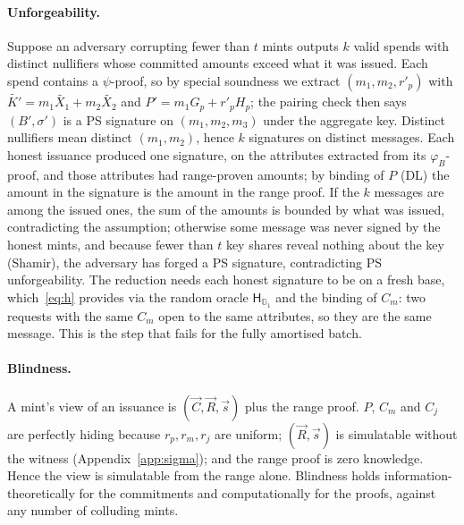 \documentclass[10pt,a5paper]{article}
\newcommand{\K}[1]{#1}                      %
\newcommand{\Go}[1]{#1}                     %
\newcommand{\Gt}[1]{\tilde{#1}}             %
\newcommand{\K}[1]{{\color{ScalarCol}#1}}   %
\newcommand{\Go}[1]{{\color{GoneCol}#1}}    %
\newcommand{\Gt}[1]{{\color{GtwoCol}#1}}    %
\newcommand{\GG}[1]{\mathbb{G}_{#1}}
\newcommand{\Hg}{\mathsf{H}_{\GG{1}}}
\newcommand{\vv}[1]{\vec{#1}}
\begin{document}
\paragraph{Unforgeability.} Suppose an adversary corrupting fewer than $t$
mints outputs $k$ valid spends with distinct nullifiers whose committed amounts
exceed what it was issued. Each spend contains a $\psi$-proof, so by special
soundness we extract $(\K{m_1},\K{m_2},\K{r'_p})$ with
$\Gt{K'} = \K{m_1}\Gt{X_1} + \K{m_2}\Gt{X_2}$ and $\Go{P'} = \K{m_1}\Go{G_p} + \K{r'_p}\Go{H_p}$;
the pairing check then says $(\Go{B'},\Go{\sigma'})$ is a PS signature on
$(\K{m_1},\K{m_2},\K{m_3})$ under the aggregate key. Distinct nullifiers mean
distinct $(\K{m_1},\K{m_2})$, hence $k$ signatures on distinct messages. Each
honest issuance produced one signature, on the attributes extracted from its
$\varphi_{\Go{B}}$-proof, and those attributes had range-proven amounts; by
binding of $\Go{P}$ (DL) the amount in the signature is the amount in the range
proof. If the $k$ messages are among the issued ones, the sum of the amounts is
bounded by what was issued, contradicting the assumption; otherwise some
message was never signed by the honest mints, and because fewer than $t$ key
shares reveal nothing about the key (Shamir), the adversary has forged a PS
signature, contradicting PS unforgeability. The reduction needs each honest
signature to be on a fresh base, which~\eqref{eq:h} provides via the random
oracle $\Hg$ and the binding of $\Go{C_m}$: two requests with the same
$\Go{C_m}$ open to the same attributes, so they are the same message. This is
the step that fails for the fully amortised batch.

\paragraph{Blindness.} A mint's view of an issuance is
$(\vv{C}, \vv{R}, \vv{s})$ plus the range proof. $\Go{P}$, $\Go{C_m}$ and
$\Go{C_j}$ are perfectly hiding because $\K{r_p},\K{r_m},\K{r_j}$ are uniform;
$(\vv{R},\vv{s})$ is simulatable without the witness (Appendix~\ref{app:sigma});
and the range proof is zero knowledge. Hence the view is simulatable from the
range alone. Blindness holds information-theoretically for the commitments and
computationally for the proofs, against any number of colluding mints.
\end{document}
